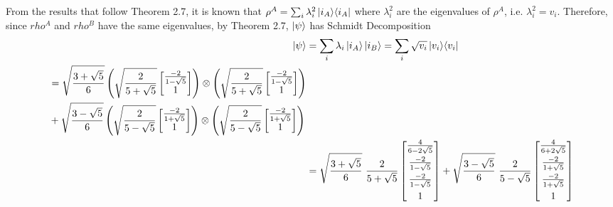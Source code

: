 \begin{enumerate}
        From the results that follow Theorem 2.7,
        it is known that $\rho^A = \sum_i \lambda_i^2 \mathop{\mathinner{ |{i_A}\rangle \langle{i_A}|}}$
        where $\lambda_i^2$ are the eigenvalues of $\rho^A$,
        i.e. $\lambda_i^2 = v_i$.
        Therefore, since $rho^A$ and $rho^B$ have the same eigenvalues,
        by Theorem 2.7, $\ket{\psi}$ has Schmidt Decomposition
        \begin{align}
            \ket{\psi} &= \sum_i \lambda_i \ket{i_A} \ket{i_B}
                = \sum_i \sqrt{v_i} \mathop{\mathinner{ |{v_i}\rangle \langle{v_i}|}}\\
            \begin{split} &= \sqrt{\frac{3 + \sqrt5}{6}} \left( 
                    \sqrt{\frac{2}{5 + \sqrt5}} \left[ \begin{matrix}
                    \frac{-2}{1 - \sqrt5} \\ 1 \end{matrix} \right]
                \right) \otimes \left(
                    \sqrt{\frac{2}{5 + \sqrt5}} \left[ \begin{matrix}
                    \frac{-2}{1 - \sqrt5} \\ 1 \end{matrix} \right]
                \right)
                \\ &+
                \sqrt{\frac{3 - \sqrt5}{6}} \left(
                    \sqrt{\frac{2}{5 - \sqrt5}} \left[ \begin{matrix}
                    \frac{-2}{1 + \sqrt5} \\ 1 \end{matrix} \right]
                \right) \otimes \left(
                    \sqrt{\frac{2}{5 - \sqrt5}} \left[ \begin{matrix}
                    \frac{-2}{1 + \sqrt5} \\ 1 \end{matrix} \right]
                \right) \end{split} \\
            &= \sqrt{\frac{3 + \sqrt5}{6}}\ \frac{2}{5 + \sqrt5}
                \left[ \begin{matrix}
                    \frac{4}{6 - 2 \sqrt5} \\[5pt] \frac{-2}{1 - \sqrt5} \\[5pt]
                    \frac{-2}{1 - \sqrt5} \\[5pt] 1
                \end{matrix} \right] +
                \sqrt{\frac{3 - \sqrt5}{6}}\ \frac{2}{5 - \sqrt5}
                \left[ \begin{matrix}
                    \frac{4}{6 + 2 \sqrt5} \\[5pt] \frac{-2}{1 + \sqrt5} \\[5pt]
                    \frac{-2}{1 + \sqrt5} \\[5pt] 1
                \end{matrix} \right]
                \label{eq:schmidt_dec_after_tensor_prod}
        \end{align}
        

\end{enumerate}
